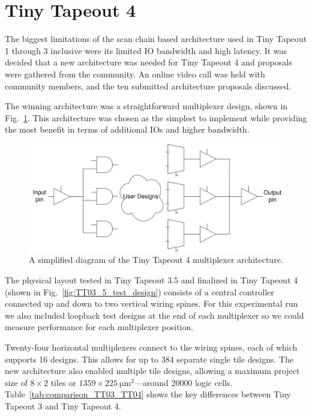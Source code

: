 \section{Tiny Tapeout 4}
\label{sec:tinytapeout4}

The biggest limitations of the scan chain based architecture used in Tiny Tapeout 1 through 3 inclusive were its limited IO bandwidth and high latency.
It was decided that a new architecture was needed for Tiny Tapeout 4 and proposals were gathered from the community.
An online video call was held with community members, and the ten submitted architecture proposals discussed.

The winning architecture was a straightforward multiplexer design, shown in Fig.~\ref{fig:multiplexer_design}. This architecture was chosen as the simplest to implement while providing the most benefit in terms of additional IOs and higher bandwidth.

\begin{figure}[!t]
\centering
\includegraphics[width=\columnwidth]{./Figs/mux architecture.png}
\caption{A simplified diagram of the Tiny Tapeout 4 multiplexer architecture.}
\label{fig:multiplexer_design}
\end{figure}

The physical layout tested in Tiny Tapeout 3.5 and finalized in Tiny Tapeout 4 (shown in Fig.~\ref{fig:TT03_5_test_design}) consists of a central controller connected up and down to two vertical wiring spines.
For this experimental run we also included loopback test designs at the end of each multiplexer so we could measure performance for each multiplexer position.

Twenty-four horizontal multiplexers connect to the wiring spines, each of which supports 16 designs.
This allows for up to 384 separate single tile designs.
The new architecture also enabled multiple tile designs, allowing a maximum project size of $8 \times 2$ tiles or $1359 \times \qty{225}{\um\squared}$---around \num{20000} logic cells. Table~\ref{tab:comparison_TT03_TT04} shows the key differences between Tiny Tapeout 3 and Tiny Tapeout 4.


